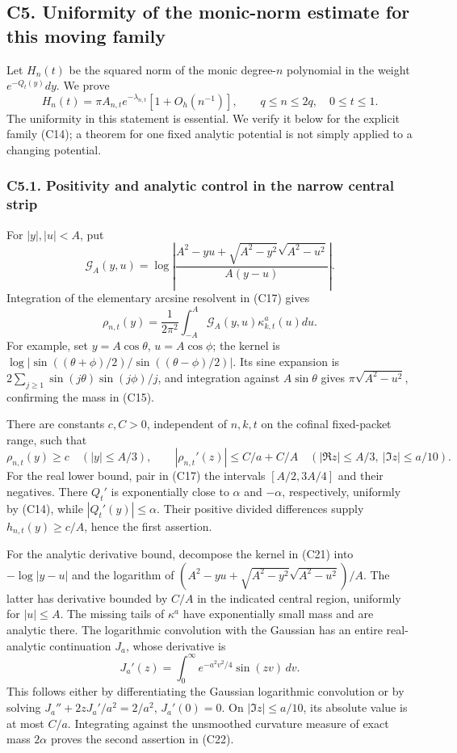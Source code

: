\subsection{C5. Uniformity of the monic-norm estimate for this moving
family}\label{sa:c5.-uniformity-of-the-monic-norm-estimate-for-this-moving-family}

Let \(H_n(t)\) be the squared norm of the monic degree-\(n\) polynomial
in the weight \(e^{-Q_t(y)}dy\). We prove \[
\boxed{H_n(t)=\pi A_{n,t}e^{-\lambda_{n,t}}
\left[1+O_h(n^{-1})\right],
\qquad q\le n\le2q,\quad0\le t\le1.}\tag{C20}
\] The uniformity in this statement is essential. We verify it below for
the explicit family (C14); a theorem for one fixed analytic potential is
not simply applied to a changing potential.

\subsubsection{C5.1. Positivity and analytic control in the narrow
central
strip}\label{sa:c5.1.-positivity-and-analytic-control-in-the-narrow-central-strip}

For \(|y|,|u|<A\), put \[
\mathcal G_A(y,u)=
\log\left|\frac{A^2-yu+\sqrt{A^2-y^2}\sqrt{A^2-u^2}}
{A(y-u)}\right|.
\] Integration of the elementary arcsine resolvent in (C17) gives \[
\rho_{n,t}(y)=\frac1{2\pi^2}\int_{-A}^A
\mathcal G_A(y,u)\kappa^a_{k,t}(u)du.\tag{C21}
\] For example, set \(y=A\cos\theta\), \(u=A\cos\phi\); the kernel is
\(\log|\sin((\theta+\phi)/2)/\sin((\theta-\phi)/2)|\). Its sine
expansion is \(2\sum_{j\ge1}\sin(j\theta)\sin(j\phi)/j\), and
integration against \(A\sin\theta\) gives \(\pi\sqrt{A^2-u^2}\),
confirming the mass in (C15).

There are constants \(c,C>0\), independent of \(n,k,t\) on the cofinal
fixed-packet range, such that \[
\rho_{n,t}(y)\ge c\quad(|y|\le A/3),
\qquad
|\rho_{n,t}'(z)|\le C/a+C/A
\quad(|\Re z|\le A/3,\ |\Im z|\le a/10).
\tag{C22}
\] For the real lower bound, pair in (C17) the intervals \([A/2,3A/4]\)
and their negatives. There \(Q_t'\) is exponentially close to \(\alpha\)
and \(-\alpha\), respectively, uniformly by (C14), while
\(|Q_t'(y)|\le\alpha\). Their positive divided differences supply
\(h_{n,t}(y)\ge c/A\), hence the first assertion.

For the analytic derivative bound, decompose the kernel in (C21) into
\(-\log|y-u|\) and the logarithm of
\((A^2-yu+\sqrt{A^2-y^2}\sqrt{A^2-u^2})/A\). The latter has derivative
bounded by \(C/A\) in the indicated central region, uniformly for
\(|u|\le A\). The missing tails of \(\kappa^a\) have exponentially small
mass and are analytic there. The logarithmic convolution with the
Gaussian has an entire real-analytic continuation \(J_a\), whose
derivative is \[
J_a'(z)=\int_0^\infty e^{-a^2v^2/4}\sin(zv)\,dv.
\] This follows either by differentiating the Gaussian logarithmic
convolution or by solving \(J_a''+2zJ_a'/a^2=2/a^2\), \(J_a'(0)=0\). On
\(|\Im z|\le a/10\), its absolute value is at most \(C/a\). Integrating
against the unsmoothed curvature measure of exact mass \(2\alpha\)
proves the second assertion in (C22).

